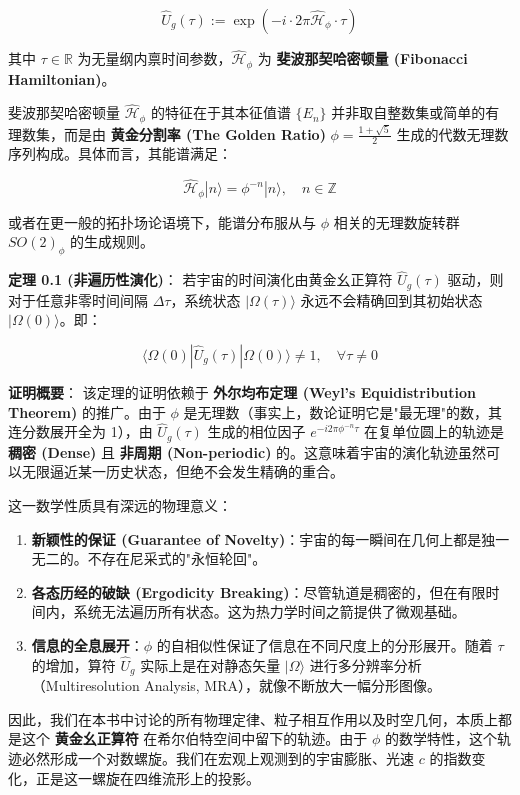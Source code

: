 \[\hat{U}_g(\tau) := \exp\left( -i \cdot 2\pi \hat{\mathcal{H}}_\phi \cdot \tau \right)\]

其中 $\tau \in \mathbb{R}$ 为无量纲内禀时间参数，$\hat{\mathcal{H}}_\phi$ 为 \textbf{斐波那契哈密顿量 (Fibonacci Hamiltonian)}。

斐波那契哈密顿量 $\hat{\mathcal{H}}_\phi$ 的特征在于其本征值谱 $\{E_n\}$ 并非取自整数集或简单的有理数集，而是由 \textbf{黄金分割率 (The Golden Ratio)} $\phi = \frac{1+\sqrt{5}}{2}$ 生成的代数无理数序列构成。具体而言，其能谱满足：

\[\hat{\mathcal{H}}_\phi |n\rangle = \phi^{-n} |n\rangle, \quad n \in \mathbb{Z}\]

或者在更一般的拓扑场论语境下，能谱分布服从与 $\phi$ 相关的无理数旋转群 $SO(2)_{\phi}$ 的生成规则。

\textbf{定理 0.1 (非遍历性演化)}：
若宇宙的时间演化由黄金幺正算符 $\hat{U}_g(\tau)$ 驱动，则对于任意非零时间间隔 $\Delta \tau$，系统状态 $|\Omega(\tau)\rangle$ 永远不会精确回到其初始状态 $|\Omega(0)\rangle$。即：

\[\langle \Omega(0) | \hat{U}_g(\tau) | \Omega(0) \rangle \neq 1, \quad \forall \tau \neq 0\]

\textbf{证明概要}：
该定理的证明依赖于 \textbf{外尔均布定理 (Weyl's Equidistribution Theorem)} 的推广。由于 $\phi$ 是无理数（事实上，数论证明它是"最无理"的数，其连分数展开全为 1），由 $\hat{U}_g(\tau)$ 生成的相位因子 $e^{-i 2\pi \phi^{-n} \tau}$ 在复单位圆上的轨迹是 \textbf{稠密 (Dense)} 且 \textbf{非周期 (Non-periodic)} 的。这意味着宇宙的演化轨迹虽然可以无限逼近某一历史状态，但绝不会发生精确的重合。

这一数学性质具有深远的物理意义：

\begin{enumerate}
\item \textbf{新颖性的保证 (Guarantee of Novelty)}：宇宙的每一瞬间在几何上都是独一无二的。不存在尼采式的"永恒轮回"。
\item \textbf{各态历经的破缺 (Ergodicity Breaking)}：尽管轨道是稠密的，但在有限时间内，系统无法遍历所有状态。这为热力学时间之箭提供了微观基础。
\item \textbf{信息的全息展开}：$\phi$ 的自相似性保证了信息在不同尺度上的分形展开。随着 $\tau$ 的增加，算符 $\hat{U}_g$ 实际上是在对静态矢量 $|\Omega\rangle$ 进行多分辨率分析（Multiresolution Analysis, MRA），就像不断放大一幅分形图像。
\end{enumerate}

因此，我们在本书中讨论的所有物理定律、粒子相互作用以及时空几何，本质上都是这个 \textbf{黄金幺正算符} 在希尔伯特空间中留下的轨迹。由于 $\phi$ 的数学特性，这个轨迹必然形成一个对数螺旋。我们在宏观上观测到的宇宙膨胀、光速 $c$ 的指数变化，正是这一螺旋在四维流形上的投影。

